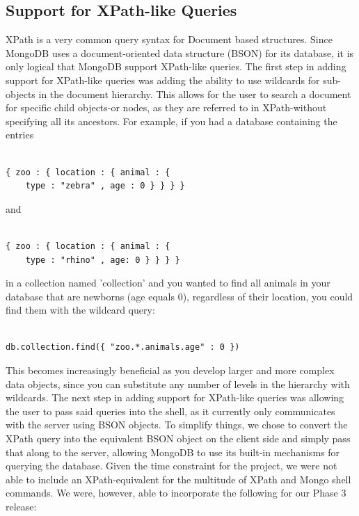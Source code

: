 \documentclass{../dependencies/acm_proc_article-sp}
\begin{document}
\subsection{Support for XPath-like Queries}
XPath is a very common query syntax for Document based structures. Since MongoDB uses a document-oriented data structure (BSON) for its database, it is only logical that MongoDB support XPath-like queries. The first step in adding support for XPath-like queries was adding the ability to use wildcards for sub-objects in the document hierarchy. This allows for the user to search a document for specific child objects-or nodes, as they are referred to in XPath-without specifying all its ancestors. For example, if you had a database containing the entries

\begin{lstlisting}

{ zoo : { location : { animal : {
    type : "zebra" , age : 0 } } } }
\end{lstlisting}

and

\begin{lstlisting}

{ zoo : { location : { animal : {
    type : "rhino" , age: 0 } } } }
\end{lstlisting}

in a collection named 'collection' and you wanted to find all animals in your database that are newborns (age equals 0), regardless of their location, you could find them with the wildcard query:

\begin{lstlisting}

db.collection.find({ "zoo.*.animals.age" : 0 })
\end{lstlisting}

This becomes increasingly beneficial as you develop larger and more complex data objects, since you can substitute any number of levels in the hierarchy with wildcards. The next step in adding support for XPath-like queries was allowing the user to pass said queries into the shell, as it currently only communicates with the server using BSON objects. To simplify things, we chose to convert the XPath query into the equivalent BSON object on the client side and simply pass that along to the server, allowing MongoDB to use its built-in mechanisms for querying the database. Given the time constraint for the project, we were not able to include an XPath-equivalent for the multitude of XPath and Mongo shell commands. We were, however, able to incorporate the following for our Phase 3 release:
\end{document}
